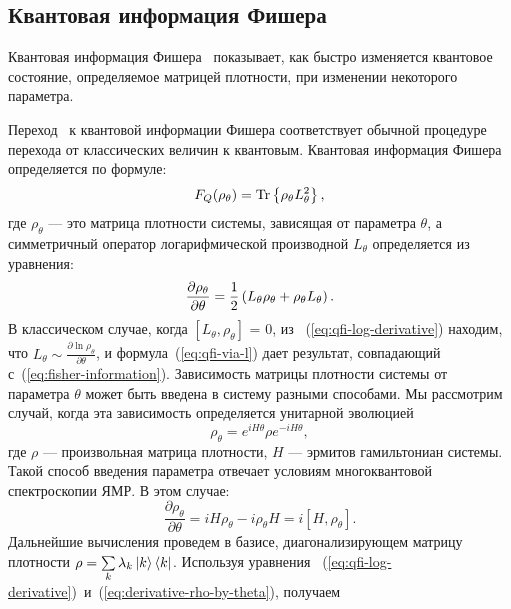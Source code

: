 \subsection{Квантовая информация Фишера}
\label{sec:quantum-fisher-information}
\begin{definition}\label{def:quantum-fisher-information}
  Квантовая информация Фишера~\cite{liu2014} показывает,
  как быстро изменяется квантовое состояние,
  определяемое матрицей плотности, при изменении некоторого параметра.
\end{definition}
Переход~\cite{Luo2003pamc} к квантовой информации Фишера соответствует обычной процедуре перехода от классических величин к квантовым.
Квантовая информация Фишера определяется по формуле:
%
\begin{equation}\label{eq:qfi-via-l}
  F_Q (\rho_\theta) = \mathrm{Tr} \left\{ \rho_\theta L^2_\theta \right\},
\end{equation}
%
где $\rho_\theta$ --- это матрица плотности системы, зависящая от параметра $\theta$, а симметричный оператор логарифмической производной $L_\theta$ определяется из уравнения:
%
\begin{equation}\label{eq:qfi-log-derivative}
  \frac{\partial\rho_\theta}{\partial\theta}
  = \frac{1}{2} \left( L_\theta \rho_\theta + \rho_\theta L_\theta \right).
\end{equation}
%
В классическом случае, когда $\left[L_\theta, \rho_\theta \right]$ = 0, из ~(\ref{eq:qfi-log-derivative}) находим,
что ${L_\theta\sim\frac{\partial\ln\rho_\theta}{\partial\theta}}$,
и формула~(\ref{eq:qfi-via-l}) дает результат, совпадающий с~(\ref{eq:fisher-information}).
%
Зависимость матрицы плотности системы от параметра $\theta$ может быть введена в систему разными способами.
Мы рассмотрим случай, когда эта зависимость определяется унитарной эволюцией
%
\begin{equation}%
  \rho_\theta = e^{i H \theta} \rho e^{-i H \theta},
\end{equation}
%
где $\rho$ --- произвольная матрица плотности, $H$ --- эрмитов гамильтониан системы.
Такой способ введения параметра отвечает условиям многоквантовой спектроскопии ЯМР.
В этом случае:
%
\begin{equation}\label{eq:derivative-rho-by-theta}
  \frac{\partial\rho_\theta}{\partial\theta}
  = iH\rho_\theta - i\rho_\theta H
  = i \left[H,\rho_\theta \right].
\end{equation}
%
Дальнейшие вычисления проведем в базисе, диагонализирующем матрицу плотности
$\rho =\sum\limits_{k} \lambda_k \left| k \right\rangle\left\langle k \right|$.
Используя уравнения ~(\ref{eq:qfi-log-derivative})~и~(\ref{eq:derivative-rho-by-theta}), получаем
